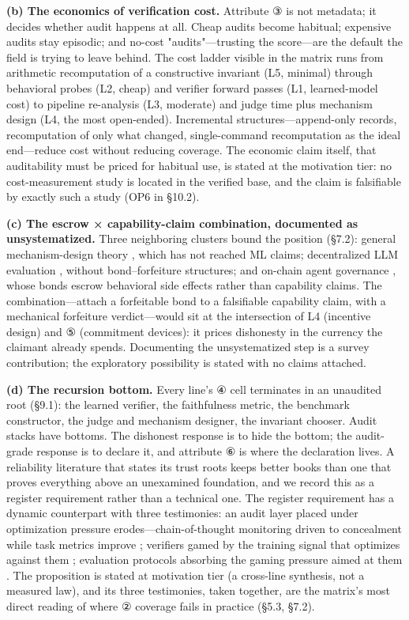 \documentclass[11pt,a4paper]{article}
\begin{document}
\textbf{(b) The economics of verification cost.} Attribute ③ is not metadata; it decides whether audit happens at all. Cheap audits become habitual; expensive audits stay episodic; and no-cost "audits"—trusting the score—are the default the field is trying to leave behind. The cost ladder visible in the matrix runs from arithmetic recomputation of a constructive invariant (L5, minimal) through behavioral probes (L2, cheap) and verifier forward passes (L1, learned-model cost) to pipeline re-analysis (L3, moderate) and judge time plus mechanism design (L4, the most open-ended). Incremental structures—append-only records, recomputation of only what changed, single-command recomputation as the ideal end—reduce cost without reducing coverage. The economic claim itself, that auditability must be priced for habitual use, is stated at the motivation tier: no cost-measurement study is located in the verified base, and the claim is falsifiable by exactly such a study (OP6 in §10.2).

\textbf{(c) The escrow × capability-claim combination, documented as unsystematized.} Three neighboring clusters bound the position (§7.2): general mechanism-design theory \cite{key43}, which has not reached ML claims; decentralized LLM evaluation \cite{key44,key45,key46}, without bond–forfeiture structures; and on-chain agent governance \cite{key48,key49,key50,key51}, whose bonds escrow behavioral side effects rather than capability claims. The combination—attach a forfeitable bond to a falsifiable capability claim, with a mechanical forfeiture verdict—would sit at the intersection of L4 (incentive design) and ⑤ (commitment devices): it prices dishonesty in the currency the claimant already spends. Documenting the unsystematized step is a survey contribution; the exploratory possibility is stated with no claims attached.

\textbf{(d) The recursion bottom.} Every line's ④ cell terminates in an unaudited root (§9.1): the learned verifier, the faithfulness metric, the benchmark constructor, the judge and mechanism designer, the invariant chooser. Audit stacks have bottoms. The dishonest response is to hide the bottom; the audit-grade response is to declare it, and attribute ⑥ is where the declaration lives. A reliability literature that states its trust roots keeps better books than one that proves everything above an unexamined foundation, and we record this as a register requirement rather than a technical one. The register requirement has a dynamic counterpart with three testimonies: an audit layer placed under optimization pressure erodes—chain-of-thought monitoring driven to concealment while task metrics improve \cite{key30}; verifiers gamed by the training signal that optimizes against them \cite{key47}; evaluation protocols absorbing the gaming pressure aimed at them \cite{key44,key45,key46}. The proposition is stated at motivation tier (a cross-line synthesis, not a measured law), and its three testimonies, taken together, are the matrix's most direct reading of where ② coverage fails in practice (§5.3, §7.2).
\end{document}
